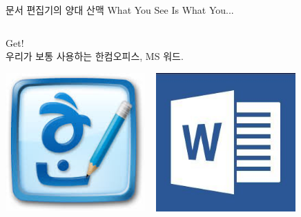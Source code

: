 \documentclass[12pt]{beamer}
\begin{document}
\begin{frame}{문서 편집기의 양대 산맥}
	What You See Is What You...
	\vfill
	\begin{columns}
		\begin{column}{0.5\textwidth}
			Get! \\
			\vfill
			우리가 보통 사용하는 한컴오피스, MS 워드. \\
			\begin{center}
				\includegraphics[width=0.4\textwidth]{hanwordicon.jpg}
				~
				\includegraphics[width=0.4\textwidth]{mswordicon.jpg}
			\end{center}
			

\end{column}
\end{columns}
\end{frame}
\end{document}
